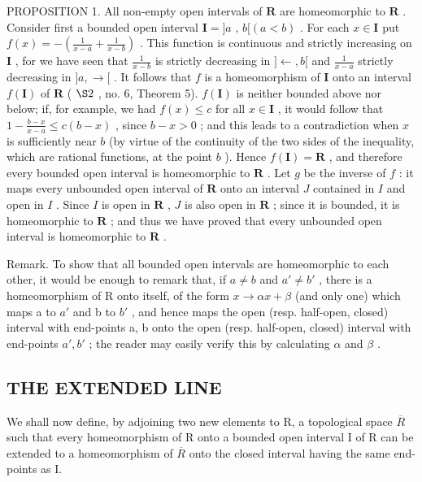 PROPOSITION 1. All non-empty open intervals of \(\mathbf{R}\) are homeomorphic to \(\mathbf{R}\) . Consider first a bounded open interval \(\mathbf{I} = ]a\) , \(b[(a < b)\) . For each \(x \in \mathbf{I}\) put \(f(x) = -\left(\frac{1}{x - a} + \frac{1}{x - b}\right)\) . This function is continuous and strictly increasing on \(\mathbf{I}\) , for we have seen that \(\frac{1}{x - b}\) is strictly decreasing in \(]\leftarrow, b[\) and \(\frac{1}{x - a}\) strictly decreasing in \(]a, \rightarrow[\) . It follows that \(f\) is a homeomorphism of \(\mathbf{I}\) onto an interval \(f(\mathbf{I})\) of \(\mathbf{R}\) ( \(\S 2\) , no. 6, Theorem 5). \(f(\mathbf{I})\) is neither bounded above nor below; if, for example, we had \(f(x) \leqslant c\) for all \(x \in \mathbf{I}\) , it would follow that \(1 - \frac{b - x}{x - a} \leqslant c(b - x)\) , since \(b - x > 0\) ; and this leads to a contradiction when \(x\) is sufficiently near \(b\) (by virtue of the continuity of the two sides of the inequality, which are rational functions, at the point \(b\) ). Hence \(f(\mathbf{I}) = \mathbf{R}\) , and therefore every bounded open interval is homeomorphic to \(\mathbf{R}\) . Let \(g\) be the inverse of \(f\) : it maps every unbounded open interval of \(\mathbf{R}\) onto an interval \(J\) contained in \(I\) and open in \(I\) . Since \(I\) is open in \(\mathbf{R}\) , \(J\) is also open in \(\mathbf{R}\) ; since it is bounded, it is homeomorphic to \(\mathbf{R}\) ; and thus we have proved that every unbounded open interval is homeomorphic to \(\mathbf{R}\) .

Remark. To show that all bounded open intervals are homeomorphic to each other, it would be enough to remark that, if \(a \neq b\) and \(a' \neq b'\) , there is a homeomorphism of R onto itself, of the form \(x \to \alpha x + \beta\) (and only one) which maps a to \(a'\) and b to \(b'\) , and hence maps the open (resp. half-open, closed) interval with end-points a, b onto the open (resp. half-open, closed) interval with end-points \(a', b'\) ; the reader may easily verify this by calculating \(\alpha\) and \(\beta\) .

\subsection{THE EXTENDED LINE}

We shall now define, by adjoining two new elements to R, a topological space \(\overline{R}\) such that every homeomorphism of R onto a bounded open interval I of R can be extended to a homeomorphism of \(\overline{R}\) onto the closed interval having the same end-points as I.

